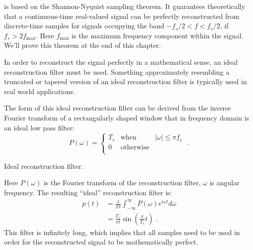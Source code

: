  is based on the
Shannon-Nyquist sampling theorem. It guarantees theoretically that a continuous-time real-valued signal can be perfectly reconstructed from discrete-time samples for signals occupying the band $-f_s/2 < f < f_s/2$, if $f_s > 2f_{\mathrm{max}}$. Here $f_{\mathrm{max}}$ is the maximum frequency component within the signal. We'll prove this theorem at the end of this chapter.

In order to reconstruct the signal perfectly in a mathematical sense, an ideal reconstruction filter must be used. Something approximately resembling a truncated or tapered version of an ideal reconstruction filter is typically used in real world applications.

The form of this ideal reconstruction filter can be derived from the inverse Fourier transform of a rectangularly shaped window that in frequency domain is an ideal low pass filter:
\begin{equation}
P(\omega) = \left\{
  \begin{array}{rcr}
    T_s & \mathrm{when} & |\omega| \le \pi f_s \\
    0 & \mathrm{otherwise} & \\
  \end{array}
\right. \,\,.
\end{equation}
\begin{marginfigure}
\begin{center}
\end{center}
\caption{Ideal reconstruction filter.}
\end{marginfigure}
Here $P(\omega)$ is the Fourier transform of the reconstruction
filter, $\omega$ is angular frequency. The resulting ``ideal''
reconstruction filter is:
\begin{align}
p(t)&=\frac{1}{2\pi}\int_{-\infty}^{\infty} P(\omega)e^{i\omega t}d\omega \\
&= \frac{T_s}{\pi t}\sin\left(\frac{\pi}{T_s}t\right)\,\,.
\end{align}
This filter is infinitely long, which implies that all samples need to be used in order for the reconstructed signal to be mathematically perfect.

